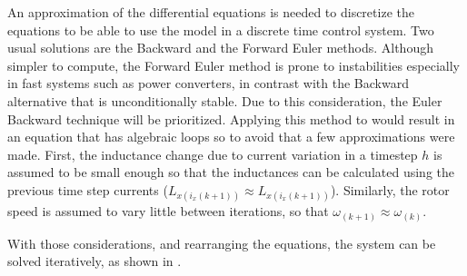 \documentclass[9pt,conference]{IEEEtran}
\begin{document}
An approximation of the differential equations is needed to discretize the equations to be able to use the model in a discrete time control system. Two usual solutions are the Backward and the Forward Euler methods. Although simpler to compute, the Forward Euler method is prone to instabilities especially in fast systems such as power converters, in contrast with the Backward alternative that is unconditionally stable. Due to this consideration, the Euler Backward technique will be prioritized. Applying this method to  would result in an equation that has algebraic loops so to avoid that a few approximations were made. First, the inductance change due to current variation in a timestep $h$ is assumed to be small enough so that the inductances can be calculated using the previous time step currents ($ L_{x(i_x(k+1))} \approx L_{x(i_x(k+1))} $). Similarly, the rotor speed is assumed to vary little between iterations, so that $\omega_{(k+1)} \approx \omega_{(k)}$.

With those considerations, and rearranging the equations, the system can be solved iteratively, as shown in .
\end{document}
